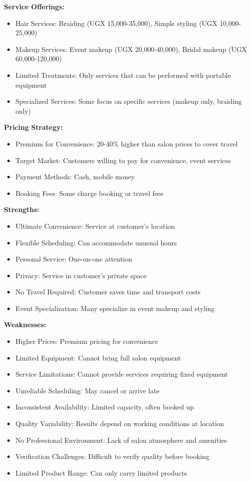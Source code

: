 \textbf{Service Offerings:}
\begin{itemize}[leftmargin=2em]
    \item Hair Services: Braiding (UGX 15,000-35,000), Simple styling (UGX 10,000-25,000)
    \item Makeup Services: Event makeup (UGX 20,000-40,000), Bridal makeup (UGX 60,000-120,000)
    \item Limited Treatments: Only services that can be performed with portable equipment
    \item Specialized Services: Some focus on specific services (makeup only, braiding only)
\end{itemize}

\textbf{Pricing Strategy:}
\begin{itemize}[leftmargin=2em]
    \item Premium for Convenience: 20-40\% higher than salon prices to cover travel
    \item Target Market: Customers willing to pay for convenience, event services
    \item Payment Methods: Cash, mobile money
    \item Booking Fees: Some charge booking or travel fees
\end{itemize}

\textbf{Strengths:}
\begin{itemize}[leftmargin=2em]
    \item Ultimate Convenience: Service at customer's location
    \item Flexible Scheduling: Can accommodate unusual hours
    \item Personal Service: One-on-one attention
    \item Privacy: Service in customer's private space
    \item No Travel Required: Customer saves time and transport costs
    \item Event Specialization: Many specialize in event makeup and styling
\end{itemize}

\textbf{Weaknesses:}
\begin{itemize}[leftmargin=2em]
    \item Higher Prices: Premium pricing for convenience
    \item Limited Equipment: Cannot bring full salon equipment
    \item Service Limitations: Cannot provide services requiring fixed equipment
    \item Unreliable Scheduling: May cancel or arrive late
    \item Inconsistent Availability: Limited capacity, often booked up
    \item Quality Variability: Results depend on working conditions at location
    \item No Professional Environment: Lack of salon atmosphere and amenities
    \item Verification Challenges: Difficult to verify quality before booking
    \item Limited Product Range: Can only carry limited products
\end{itemize}

